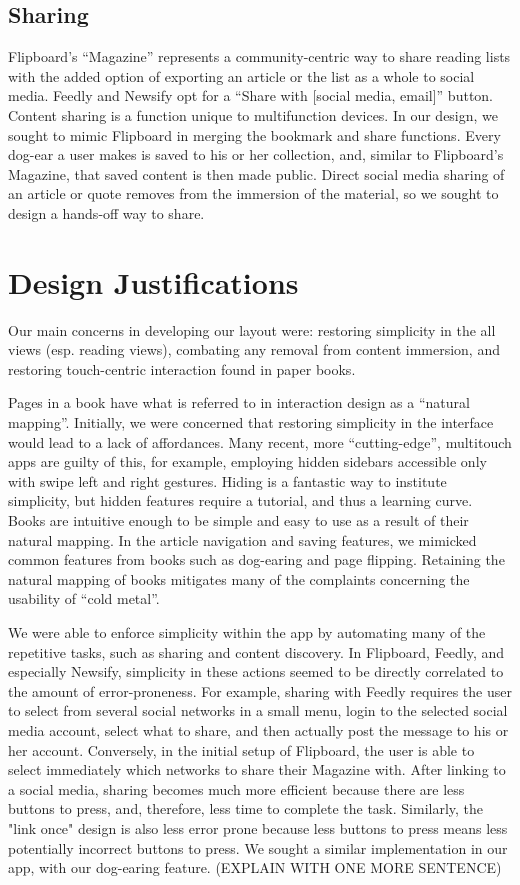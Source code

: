 \documentclass[11pt, oneside]{article}   	%
\begin{document}
\subsection{Sharing}
Flipboard's ``Magazine'' represents a community-centric way to share reading lists with the added option of exporting an article or the list as a whole to social media. Feedly and Newsify opt for a ``Share with [social media, email]'' button. Content sharing is a function unique to multifunction devices. In our design, we sought to mimic Flipboard in merging the bookmark and share functions. Every dog-ear a user makes is saved to his or her collection, and, similar to Flipboard's Magazine, that saved content is then made public. Direct social media sharing of an article or quote removes from the immersion of the material, so we sought to design a hands-off way to share.

\section{Design Justifications}
Our main concerns in developing our layout were: restoring simplicity in the all views (esp. reading views), combating any removal from content immersion, and restoring touch-centric interaction found in paper books.

Pages in a book have what is referred to in interaction design as a ``natural mapping''. Initially, we were concerned that restoring simplicity in the interface would lead to a lack of affordances. Many recent, more ``cutting-edge'', multitouch apps are guilty of this, for example, employing hidden sidebars accessible only with swipe left and right gestures. Hiding is a fantastic way to institute simplicity, but hidden features require a tutorial, and thus a learning curve. Books are intuitive enough to be simple and easy to use as a result of their natural mapping. In the article navigation and saving features, we mimicked common features from books such as dog-earing and page flipping. Retaining the natural mapping of books mitigates many of the complaints concerning the usability of ``cold metal''.

We were able to enforce simplicity within the app by automating many of the repetitive tasks, such as sharing and content discovery. In Flipboard, Feedly, and especially Newsify, simplicity in these actions seemed to be directly correlated to the amount of error-proneness. For example, sharing with Feedly requires the user to select from several social networks in a small menu, login to the selected social media account, select what to share, and then actually post the message to his or her account. Conversely, in the initial setup of Flipboard, the user is able to select immediately which networks to share their Magazine with. After linking to a social media, sharing becomes much more efficient because there are less buttons to press, and, therefore, less time to complete the task. Similarly, the "link once" design is also less error prone because less buttons to press means less potentially incorrect buttons to press. We sought a similar implementation in our app, with our dog-earing feature. (EXPLAIN WITH ONE MORE SENTENCE)
\end{document}
